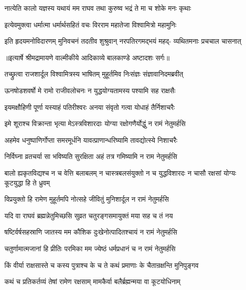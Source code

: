 \twolineshloka
{नात्येति कालो यज्ञस्य यथायं मम राघव}
{तथा कुरुष्व भद्रं ते मा च शोके मनः कृथाः} %

\twolineshloka
{इत्येवमुक्त्वा धर्मात्मा धर्मार्थसहितं वचः}
{विरराम महातेजा विश्वामित्रो महामुनिः} %

\fourlineindentedshloka
{इति हृदयमनोविदारणम्}
{मुनिवचनं तदतीव शुश्रुवान्}
{नरपतिरगमद्भयं महद्-}
{व्यथितमनाः प्रचचाल चासनात्} %


{॥इत्यार्षे श्रीमद्रामायणे वाल्मीकीये आदिकाव्ये बालकाण्डे अष्टादशः सर्गः॥}


\twolineshloka
{तच्छ्रुत्वा राजशार्दूल विश्वामित्रस्य भाषितम्}
{मुहूर्तमिव निःसंज्ञः संज्ञावानिदमब्रवीत्} %

\twolineshloka
{ऊनषोडशवर्षो मे रामो राजीवलोचनः}
{न युद्धयोग्यतामस्य पश्यामि सह राक्षसैः} %

\twolineshloka
{इयमक्षौहिणी पूर्णा यस्याहं पतिरीश्वरः}
{अनया संवृतो गत्वा योधाहं तैर्निशाचरैः} %

\twolineshloka
{इमे शूराश्च विक्रान्ता भृत्या मेऽस्त्रविशारदाः}
{योग्या रक्षोगणैर्योद्धुं न रामं नेतुमर्हसि} %

\twolineshloka
{अहमेव धनुष्पाणिर्गोप्ता समरमूर्धनि}
{यावत्प्राणान्धरिष्यामि तावद्योत्स्ये निशाचरैः} %

\twolineshloka
{निर्विघ्ना व्रतचर्या सा भविष्यति सुरक्षिता}
{अहं तत्र गमिष्यामि न राम नेतुमर्हसि} %

\threelineshloka
{बालो ह्यकृतविद्यश्च न च वेत्ति बलाबलम्}
{न चास्त्रबलसंयुक्तो न च युद्धविशारदः}
{न चासौ रक्षसां योग्यः कूटयुद्धा हि ते ध्रुवम्} %

\twolineshloka
{विप्रयुक्तो हि रामेण मुहूर्तमपि नोत्सहे}
{जीवितुं मुनिशार्दूल न रामं नेतुमर्हसि} %

\twolineshloka
{यदि वा राघवं ब्रह्मन्नेतुमिच्छसि सुव्रत}
{चतुरङ्गसमायुक्तं मया सह च तं नय} %

\twolineshloka
{षष्टिर्वर्षसहस्राणि जातस्य मम कौशिक}
{दुःखेनोत्पादितश्चायं न रामं नेतुमर्हसि} %

\twolineshloka
{चतुर्णामात्मजानां हि प्रीतिः परमिका मम}
{ज्येष्ठं धर्मप्रधानं च न रामं नेतुमर्हसि} %

\twolineshloka
{किं वीर्या राक्षसास्ते च कस्य पुत्राश्च के च ते}
{कथं प्रमाणाः के चैतान्रक्षन्ति मुनिपुङ्गव} %

\twolineshloka
{कथं च प्रतिकर्तव्यं तेषां रामेण रक्षसाम्}
{मामकैर्वा बलैर्ब्रह्मन्मया वा कूटयोधिनाम्} %

